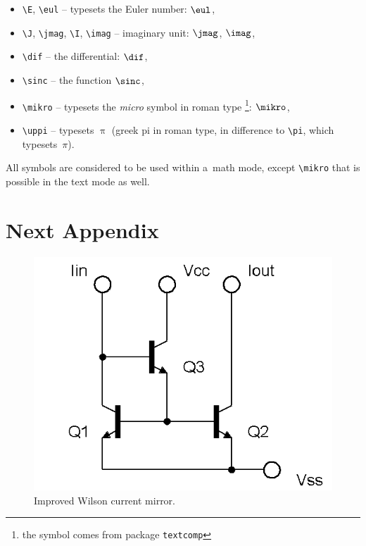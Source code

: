 \begin{itemize}
  \item
    \verb|\E|, \verb|\eul| -- typesets the Euler number: $\eul$,
  \item
    \verb|\J|, \verb|\jmag|, \verb|\I|, \verb|\imag| -- imaginary unit: $\jmag$, $\imag$,
  \item
    \verb|\dif| -- the differential: $\dif$,
  \item
    \verb|\sinc| -- the function $\sinc$,
  \item
    \verb|\mikro| -- typesets the \emph{micro} symbol in roman type%
			\footnote{the symbol comes from package \texttt{textcomp}}: $\mikro$,
	\item
		\verb|\uppi| -- typesets $\uppi$
			(greek pi in roman type, in difference to \verb|\pi|, which typesets~$\pi$).
\end{itemize}
%
All symbols are considered to be used within a~math mode, except \verb|\mikro| that is possible in the text mode as well.


\chapter{Next Appendix}

\begin{figure}[!h]
  \begin{center}
    \includegraphics[scale=0.5]{pict/ZlepseneWilsonovoZrcadloNPN}
  \end{center}
  \caption[Wilson mirror]{Improved Wilson current mirror.}
\end{figure}

